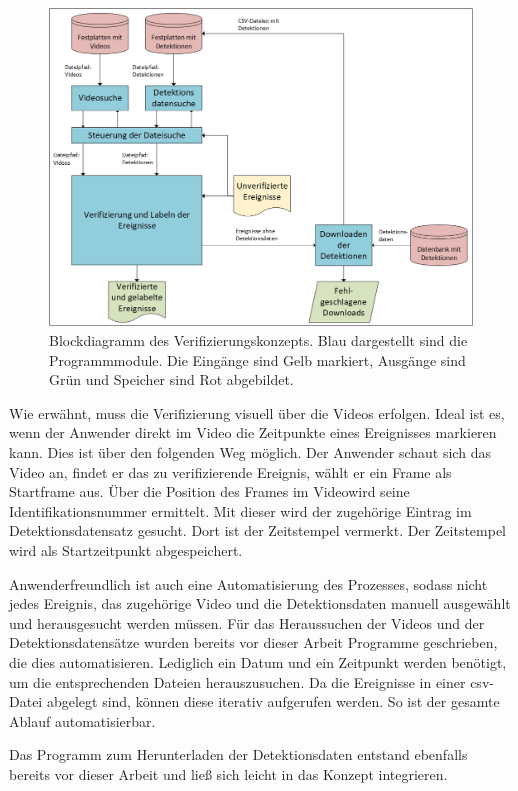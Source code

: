 \begin{figure}[htbp]
    \centering
    \includegraphics[width=\textwidth]{img/Grafiken/Verifizierungstool Konzept.png}
    \caption[Blockdiagramm des Verifizierungskonzepts.]{Blockdiagramm des Verifizierungskonzepts. Blau dargestellt sind die Programmmodule. Die Eingänge sind Gelb markiert, Ausgänge sind Grün und Speicher sind Rot abgebildet.}
    \label{fig:BlockLabeling}
\end{figure}


Wie erwähnt, muss die Verifizierung visuell über die Videos erfolgen. Ideal ist es, wenn der Anwender direkt im Video die Zeitpunkte eines Ereignisses markieren kann. Dies ist über den folgenden Weg möglich. Der Anwender schaut sich das Video an, findet er das zu verifizierende Ereignis, wählt er ein Frame als Startframe aus. Über die Position des Frames im Videowird seine Identifikationsnummer ermittelt. Mit dieser wird der zugehörige Eintrag im Detektionsdatensatz gesucht. Dort ist der Zeitstempel vermerkt. Der Zeitstempel wird als Startzeitpunkt abgespeichert. \par 

Anwenderfreundlich ist auch eine Automatisierung des Prozesses, sodass nicht jedes Ereignis, das zugehörige Video und die Detektionsdaten manuell ausgewählt und herausgesucht werden müssen. Für das Heraussuchen der Videos und der Detektionsdatensätze wurden bereits vor dieser Arbeit Programme geschrieben, die dies automatisieren. Lediglich ein Datum und ein Zeitpunkt werden benötigt, um die entsprechenden Dateien herauszusuchen. Da die Ereignisse in einer csv-Datei abgelegt sind, können diese iterativ aufgerufen werden. So ist der gesamte Ablauf automatisierbar. \par

Das Programm zum Herunterladen der Detektionsdaten entstand ebenfalls bereits vor dieser Arbeit und ließ sich leicht in das Konzept integrieren. 